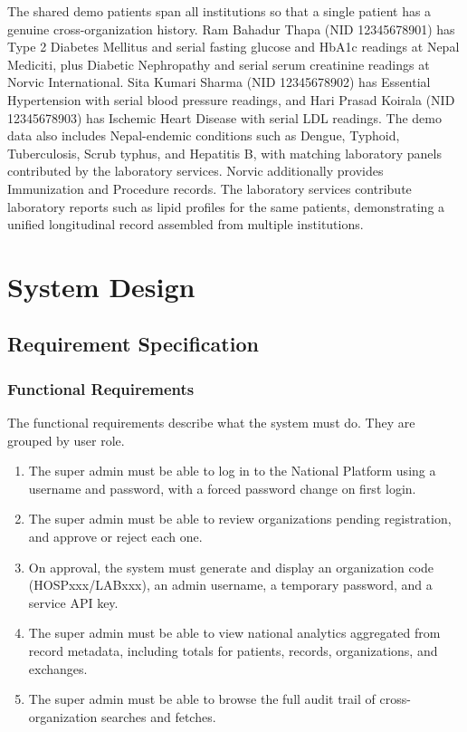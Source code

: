 \documentclass[12pt]{report}
\numberwithin{equation}{chapter}
\begin{document}
The shared demo patients span all institutions so that a single patient has a genuine cross-organization history. Ram Bahadur Thapa (NID 12345678901) has Type 2 Diabetes Mellitus and serial fasting glucose and HbA1c readings at Nepal Mediciti, plus Diabetic Nephropathy and serial serum creatinine readings at Norvic International. Sita Kumari Sharma (NID 12345678902) has Essential Hypertension with serial blood pressure readings, and Hari Prasad Koirala (NID 12345678903) has Ischemic Heart Disease with serial LDL readings. The demo data also includes Nepal-endemic conditions such as Dengue, Typhoid, Tuberculosis, Scrub typhus, and Hepatitis B, with matching laboratory panels contributed by the laboratory services. Norvic additionally provides Immunization and Procedure records. The laboratory services contribute laboratory reports such as lipid profiles for the same patients, demonstrating a unified longitudinal record assembled from multiple institutions.

\chapter{System Design}

\section{Requirement Specification}
\subsection{Functional Requirements}
The functional requirements describe what the system must do. They are grouped by user role.

\begin{enumerate}
    \item The super admin must be able to log in to the National Platform using a username and password, with a forced password change on first login.
    \item The super admin must be able to review organizations pending registration, and approve or reject each one.
    \item On approval, the system must generate and display an organization code (HOSPxxx/LABxxx), an admin username, a temporary password, and a service API key.
    \item The super admin must be able to view national analytics aggregated from record metadata, including totals for patients, records, organizations, and exchanges.
    \item The super admin must be able to browse the full audit trail of cross-organization searches and fetches.
\end{enumerate}
\end{document}
